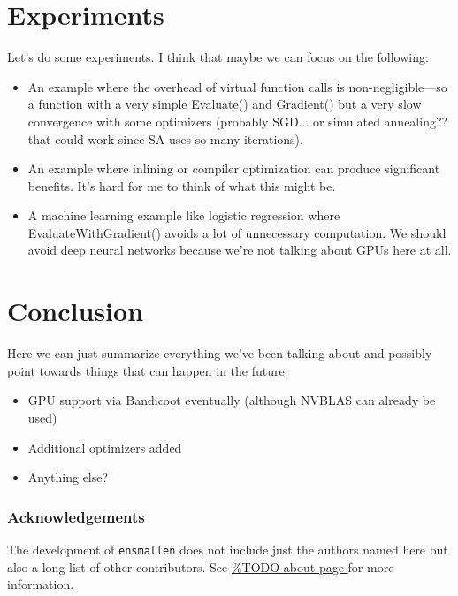 \documentclass{article}
\begin{document}


\section{Experiments}

Let's do some experiments.  I think that maybe we can focus on the following:

\begin{itemize}
  \item An example where the overhead of virtual function calls is
non-negligible---so a function with a very simple Evaluate() and Gradient() but
a very slow convergence with some optimizers (probably SGD... or simulated
annealing?? that could work since SA uses so many iterations).

  \item An example where inlining or compiler optimization can produce
significant benefits.  It's hard for me to think of what this might be.

  \item A machine learning example like logistic regression where
EvaluateWithGradient() avoids a lot of unnecessary computation.  We should avoid
deep neural networks because we're not talking about GPUs here at all.
\end{itemize}

\section{Conclusion}

Here we can just summarize everything we've been talking about and possibly
point towards things that can happen in the future:

\begin{itemize}
  \item GPU support via Bandicoot eventually (although NVBLAS can already be
used)
  \item Additional optimizers added
  \item Anything else?
\end{itemize}

\subsubsection*{Acknowledgements}

The development of {\tt ensmallen} does not include just the authors named
here but also a long list of other contributors.  See \url{%
} for more information.



\end{document}
